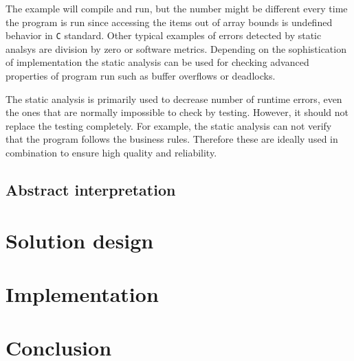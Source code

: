 \documentclass[12pt,final,oneside]{fithesis2}
\begin{document}
The example will compile and run, but the number might be different every
time the program is run since accessing the items out of array bounds is
undefined behavior in \texttt{C} standard. Other typical examples of errors detected by
static analsys are division by zero or software metrics. Depending on the
sophistication of implementation the static analysis can be used for
checking advanced properties of program run such as buffer overflows
or deadlocks.

The static analysis is primarily used to decrease number of runtime errors,
even the ones that are normally impossible to check by testing. However,
it should not replace the testing completely. For example, the static
analysis can not verify that the program follows the business
rules. Therefore these are ideally used in combination to ensure high
quality and reliability.


\section{Abstract interpretation}


\chapter{Solution design}
\label{chap:design}


\chapter{Implementation}
\label{chap:implementation}


\chapter{Conclusion}
\label{chap:conclusion}


\end{document}
